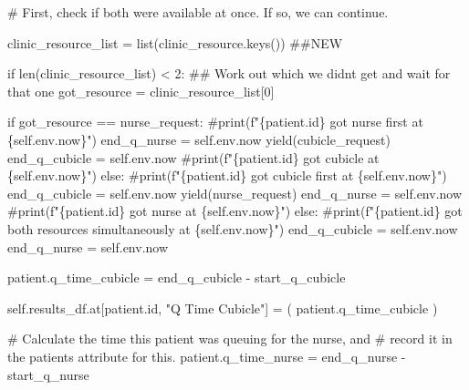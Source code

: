 \documentclass[
  letterpaper,
  DIV=11,
  numbers=noendperiod]{scrreprt}
\newenvironment{Shaded}{}{}
\newcommand{\BuiltInTok}[1]{\textcolor[rgb]{0.84,0.23,0.29}{#1}}
\newcommand{\CommentTok}[1]{\textcolor[rgb]{0.42,0.45,0.49}{#1}}
\newcommand{\ControlFlowTok}[1]{\textcolor[rgb]{0.84,0.23,0.29}{#1}}
\newcommand{\DecValTok}[1]{\textcolor[rgb]{0.00,0.36,0.77}{#1}}
\newcommand{\NormalTok}[1]{\textcolor[rgb]{0.14,0.16,0.18}{#1}}
\newcommand{\OperatorTok}[1]{\textcolor[rgb]{0.14,0.16,0.18}{#1}}
\newcommand{\StringTok}[1]{\textcolor[rgb]{0.01,0.18,0.38}{#1}}
\newcommand{\VariableTok}[1]{\textcolor[rgb]{0.89,0.38,0.04}{#1}}
\begin{document}
\begin{tcolorbox}
\begin{Shaded}
\begin{Highlighting}[]
        \CommentTok{\# First, check if both were available at once. If so, we can continue.}

\NormalTok{        clinic\_resource\_list }\OperatorTok{=} \BuiltInTok{list}\NormalTok{(clinic\_resource.keys()) }\CommentTok{\#\#NEW}

        \ControlFlowTok{if} \BuiltInTok{len}\NormalTok{(clinic\_resource\_list) }\OperatorTok{\textless{}} \DecValTok{2}\NormalTok{:}
            \CommentTok{\#\# Work out which we didn\textquotesingle{}t get and wait for that one}
\NormalTok{            got\_resource }\OperatorTok{=}\NormalTok{ clinic\_resource\_list[}\DecValTok{0}\NormalTok{]}

            \ControlFlowTok{if}\NormalTok{ got\_resource }\OperatorTok{==}\NormalTok{ nurse\_request:}
                \CommentTok{\#print(f"\{patient.id\} got nurse first at \{self.env.now\}")}
\NormalTok{                end\_q\_nurse }\OperatorTok{=} \VariableTok{self}\NormalTok{.env.now}
                \ControlFlowTok{yield}\NormalTok{(cubicle\_request)}
\NormalTok{                end\_q\_cubicle }\OperatorTok{=} \VariableTok{self}\NormalTok{.env.now}
                \CommentTok{\#print(f"\{patient.id\} got cubicle at \{self.env.now\}")}
            \ControlFlowTok{else}\NormalTok{:}
                \CommentTok{\#print(f"\{patient.id\} got cubicle first at \{self.env.now\}")}
\NormalTok{                end\_q\_cubicle }\OperatorTok{=} \VariableTok{self}\NormalTok{.env.now}
                \ControlFlowTok{yield}\NormalTok{(nurse\_request)}
\NormalTok{                end\_q\_nurse }\OperatorTok{=} \VariableTok{self}\NormalTok{.env.now}
                \CommentTok{\#print(f"\{patient.id\} got nurse at \{self.env.now\}")}
        \ControlFlowTok{else}\NormalTok{:}
            \CommentTok{\#print(f"\{patient.id\} got both resources simultaneously at \{self.env.now\}")}
\NormalTok{            end\_q\_cubicle }\OperatorTok{=} \VariableTok{self}\NormalTok{.env.now}
\NormalTok{            end\_q\_nurse }\OperatorTok{=} \VariableTok{self}\NormalTok{.env.now}

\NormalTok{        patient.q\_time\_cubicle }\OperatorTok{=}\NormalTok{ end\_q\_cubicle }\OperatorTok{{-}}\NormalTok{ start\_q\_cubicle}

        \VariableTok{self}\NormalTok{.results\_df.at[patient.}\BuiltInTok{id}\NormalTok{, }\StringTok{"Q Time Cubicle"}\NormalTok{] }\OperatorTok{=}\NormalTok{ (}
\NormalTok{              patient.q\_time\_cubicle}
\NormalTok{        )}

        \CommentTok{\# Calculate the time this patient was queuing for the nurse, and}
        \CommentTok{\# record it in the patient\textquotesingle{}s attribute for this.}
\NormalTok{        patient.q\_time\_nurse }\OperatorTok{=}\NormalTok{ end\_q\_nurse }\OperatorTok{{-}}\NormalTok{ start\_q\_nurse}


\end{Highlighting}
\end{Shaded}
\end{tcolorbox}
\end{document}
